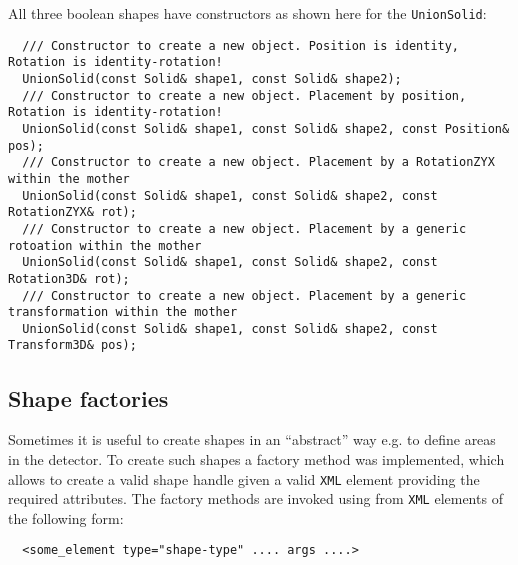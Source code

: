 All three boolean shapes have constructors as shown here for the \texttt{UnionSolid}:
\begin{verbatim}
  /// Constructor to create a new object. Position is identity, Rotation is identity-rotation!
  UnionSolid(const Solid& shape1, const Solid& shape2);
  /// Constructor to create a new object. Placement by position, Rotation is identity-rotation!
  UnionSolid(const Solid& shape1, const Solid& shape2, const Position& pos);
  /// Constructor to create a new object. Placement by a RotationZYX within the mother
  UnionSolid(const Solid& shape1, const Solid& shape2, const RotationZYX& rot);
  /// Constructor to create a new object. Placement by a generic rotoation within the mother
  UnionSolid(const Solid& shape1, const Solid& shape2, const Rotation3D& rot);
  /// Constructor to create a new object. Placement by a generic transformation within the mother
  UnionSolid(const Solid& shape1, const Solid& shape2, const Transform3D& pos);
\end{verbatim}

\subsection{Shape factories} 
Sometimes it is useful to create shapes in an ``abstract'' way e.g. to define areas in the detector. To create such shapes a factory method was implemented, which allows to create a valid shape handle given a valid \texttt{XML} element providing the required attributes. The factory methods are invoked using from \texttt{XML} elements of the following form:
\begin{verbatim}
  <some_element type="shape-type" .... args ....>
\end{verbatim}

